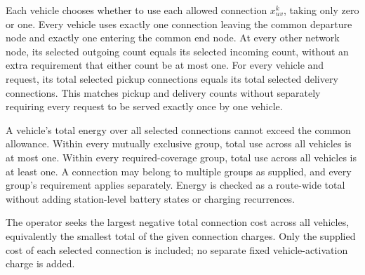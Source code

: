 \documentclass[10pt]{article}
\begin{document}
Each vehicle chooses whether to use each allowed connection $x^k_{uv}$, taking only zero or one. Every vehicle uses exactly one connection leaving the common departure node and exactly one entering the common end node. At every other network node, its selected outgoing count equals its selected incoming count, without an extra requirement that either count be at most one. For every vehicle and request, its total selected pickup connections equals its total selected delivery connections. This matches pickup and delivery counts without separately requiring every request to be served exactly once by one vehicle.

A vehicle's total energy over all selected connections cannot exceed the common allowance. Within every mutually exclusive group, total use across all vehicles is at most one. Within every required-coverage group, total use across all vehicles is at least one. A connection may belong to multiple groups as supplied, and every group's requirement applies separately. Energy is checked as a route-wide total without adding station-level battery states or charging recurrences.

The operator seeks the largest negative total connection cost across all vehicles, equivalently the smallest total of the given connection charges. Only the supplied cost of each selected connection is included; no separate fixed vehicle-activation charge is added.
\end{document}
